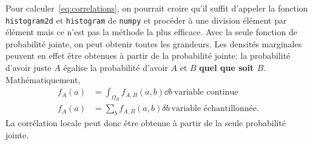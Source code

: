 \documentclass[13pt, a4paper]{extarticle}
\begin{document}
\noindent Pour calculer~\eqref{eq:correlations}, on pourrait croire qu'il suffit
d'appeler la fonction \texttt{histogram2d} et \texttt{histogram} de \texttt{numpy} et procéder
à une division élément par élément mais ce n'est pas la méthode la plus
efficace. Avec la seule fonction de probabilité jointe, on peut obtenir
toutes les grandeurs. Les densités marginales peuvent en effet être obtenues
à partir de la probabilité jointe: la probabilité d'avoir juste $A$
égalise la probabilité d'avoir $A$ et $B$ {\bf quel que soit $B$}. Mathématiquement,
\begin{align}
      f_A(a) &= \int_{\Omega_B}f_{A,B}(a,b)\dd b~\text{variable continue} \\
      f_A(a) &= \sum_b f_{A,B}(a,b)\delta b~\text{variable échantillonnée}.
\end{align}
La corrélation locale peut donc être obtenue à partir de la seule probabilité jointe. 
\end{document}
